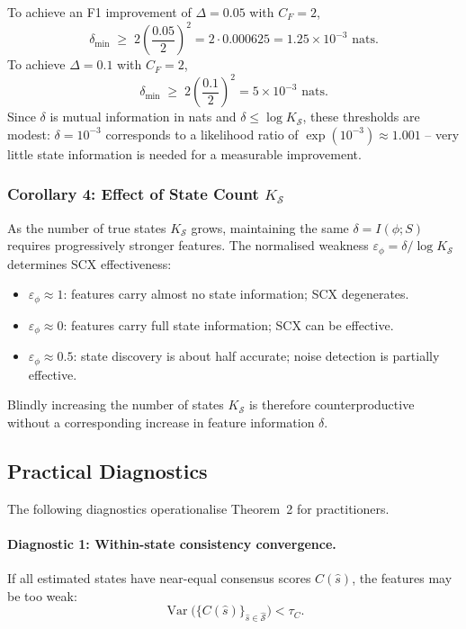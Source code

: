 \begin{example}
To achieve an F1 improvement of $\Delta = 0.05$ with $C_F = 2$,
\[
\delta_{\min} \;\geq\; 2\left(\frac{0.05}{2}\right)^2
= 2 \cdot 0.000625 = 1.25 \times 10^{-3} \text{ nats}.
\]
To achieve $\Delta = 0.1$ with $C_F = 2$,
\[
\delta_{\min} \;\geq\; 2\left(\frac{0.1}{2}\right)^2
= 5 \times 10^{-3} \text{ nats}.
\]
Since $\delta$ is mutual information in nats and $\delta \leq \log K_{\mathcal{S}}$,
these thresholds are modest: $\delta = 10^{-3}$ corresponds to a likelihood
ratio of $\exp(10^{-3}) \approx 1.001$ -- very little state information is
needed for a measurable improvement.
\end{example}

\subsubsection*{Corollary 4: Effect of State Count $K_{\mathcal{S}}$}
\label{cor:state-count}
As the number of true states $K_{\mathcal{S}}$ grows, maintaining the same
$\delta = I(\phi; S)$ requires progressively stronger features. The
normalised weakness $\varepsilon_\phi = \delta / \log K_{\mathcal{S}}$
determines SCX effectiveness:
\begin{itemize}
  \item $\varepsilon_\phi \approx 1$: features carry almost no state
        information; SCX degenerates.
  \item $\varepsilon_\phi \approx 0$: features carry full state information;
        SCX can be effective.
  \item $\varepsilon_\phi \approx 0.5$: state discovery is about half
        accurate; noise detection is partially effective.
\end{itemize}
Blindly increasing the number of states $K_{\mathcal{S}}$ is therefore
counterproductive without a corresponding increase in feature information
$\delta$.

\subsection{Practical Diagnostics}
\label{sec:thm2:diagnostics}

The following diagnostics operationalise Theorem~2 for practitioners.

\paragraph{Diagnostic 1: Within-state consistency convergence.}
If all estimated states have near-equal consensus scores $C(\hat{s})$,
the features may be too weak:
\[
\operatorname{Var}\bigl(\{C(\hat{s})\}_{\hat{s} \in \hat{\mathcal{S}}}\bigr)
< \tau_C.
\]

